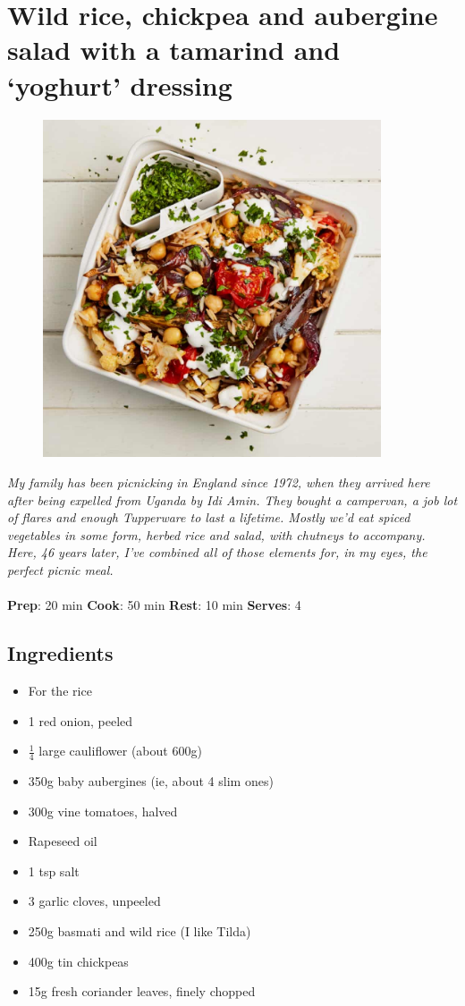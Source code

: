\documentclass{book}
\begin{document}
\section{Wild rice, chickpea and aubergine salad with a tamarind and ‘yoghurt’ dressing}
\begin{figure}
\centering\includegraphics[width=10cm,height=10cm,keepaspectratio]{Recipe_Pictures/Wild_rice,_chickpea_and_aubergine_salad_with_a_tamarind_and_yoghurt_dressing.png}
\end{figure}
\emph{My family has been picnicking in England since 1972, when they arrived here after being expelled from Uganda by Idi Amin. They bought a campervan, a job lot of flares and enough Tupperware to last a lifetime. Mostly we’d eat spiced vegetables in some form, herbed rice and salad, with chutneys to accompany. Here, 46 years later, I’ve combined all of those elements for, in my eyes, the perfect picnic meal.}\\\\ 
\textbf{Prep}: 20 min
\textbf{Cook}: 50 min
\textbf{Rest}: 10 min
\textbf{Serves}: 4
\subsection*{Ingredients}
\begin{itemize}
\item For the rice 
\item 1 red onion, peeled 
\item $\frac{1}{4}$ large cauliflower (about 600g)
\item 350g baby aubergines (ie, about 4 slim ones) 
\item 300g vine tomatoes, halved 
\item Rapeseed oil 
\item 1 tsp salt
\item 3 garlic cloves, unpeeled 
\item 250g basmati and wild rice (I like Tilda)
\item 400g tin chickpeas 
\item 15g fresh coriander leaves, finely chopped
\end{itemize}
\end{document}

